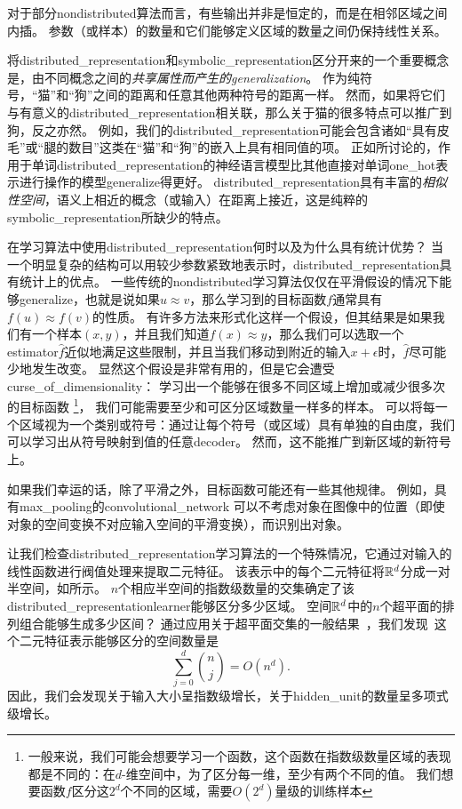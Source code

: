 对于部分\gls{nondistributed}算法而言，有些输出并非是恒定的，而是在相邻区域之间内插。
参数（或样本）的数量和它们能够定义区域的数量之间仍保持线性关系。

将\gls{distributed_representation}和\gls{symbolic_representation}区分开来的一个重要概念是，由不同概念之间的\emph{共享属性而产生的\gls{generalization}}。
作为纯符号，``猫''和``狗''之间的距离和任意其他两种符号的距离一样。
然而，如果将它们与有意义的\gls{distributed_representation}相关联，那么关于猫的很多特点可以推广到狗，反之亦然。
例如，我们的\gls{distributed_representation}可能会包含诸如``具有皮毛''或``腿的数目''这类在``猫''和``狗''的嵌入上具有相同值的项。
正如所讨论的，作用于单词\gls{distributed_representation}的神经语言模型比其他直接对单词\gls{one_hot}表示进行操作的模型\gls{generalize}得更好。
\gls{distributed_representation}具有丰富的\emph{相似性空间}，语义上相近的概念（或输入）在距离上接近，这是纯粹的\gls{symbolic_representation}所缺少的特点。


在学习算法中使用\gls{distributed_representation}何时以及为什么具有统计优势？
当一个明显复杂的结构可以用较少参数紧致地表示时，\gls{distributed_representation}具有统计上的优点。
一些传统的\gls{nondistributed}学习算法仅仅在平滑假设的情况下能够\gls{generalize}，也就是说如果$u\approx v$，那么学习到的目标函数$f$通常具有$f(u) \approx f(v)$的性质。
有许多方法来形式化这样一个假设，但其结果是如果我们有一个样本$(x,y)$，并且我们知道$f(x) \approx y$，那么我们可以选取一个\gls{estimator}$\hat{f}$近似地满足这些限制，并且当我们移动到附近的输入$x + \epsilon$时，$\hat{f}$尽可能少地发生改变。
显然这个假设是非常有用的，但是它会遭受\gls{curse_of_dimensionality}：
学习出一个能够在很多不同区域上增加或减少很多次的目标函数
\footnote{一般来说，我们可能会想要学习一个函数，这个函数在指数级数量区域的表现都是不同的：在$d$-维空间中，为了区分每一维，至少有两个不同的值。
我们想要函数$f$区分这$2^d$个不同的区域，需要$O(2^d)$量级的训练样本}，
我们可能需要至少和可区分区域数量一样多的样本。
可以将每一个区域视为一个类别或符号：通过让每个符号（或区域）具有单独的自由度，我们可以学习出从符号映射到值的任意\gls{decoder}。
然而，这不能推广到新区域的新符号上。

如果我们幸运的话，除了平滑之外，目标函数可能还有一些其他规律。
例如，具有\gls{max_pooling}的\gls{convolutional_network}
可以不考虑对象在图像中的位置（即使对象的空间变换不对应输入空间的平滑变换），而识别出对象。

让我们检查\gls{distributed_representation}学习算法的一个特殊情况，它通过对输入的线性函数进行阀值处理来提取二元特征。
该表示中的每个二元特征将$\mathbb{R}^d$分成一对半空间，如所示。
$n$个相应半空间的指数级数量的交集确定了该\gls{distributed_representation}\gls{learner}能够区分多少区域。
空间$\mathbb{R}^d$中的$n$个超平面的排列组合能够生成多少区间？
通过应用关于超平面交集的一般结果~\citep{Zaslavsky-1975}，我们发现~\citep{Pascanu+et+al-ICLR2014b}这个二元特征表示能够区分的空间数量是
\begin{equation}
	\sum_{j=0}^d \binom{n}{j} = O(n^d).
\end{equation}
因此，我们会发现关于输入大小呈指数级增长，关于\gls{hidden_unit}的数量呈多项式级增长。


